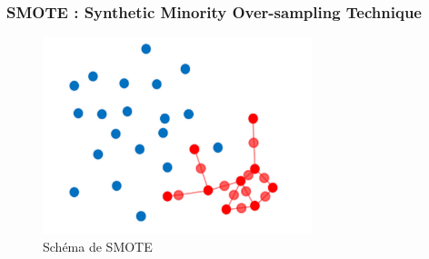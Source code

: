 \documentclass{beamer}
\begin{document}
  \begin{frame}
      \frametitle{SMOTE : Synthetic Minority Over-sampling Technique}



      \begin{figure}
          \centering
          \includegraphics[width=0.7\textwidth]{images/SMOTEA.png}
          \caption{Schéma de SMOTE}
      \end{figure}

  \end{frame}
\end{document}
